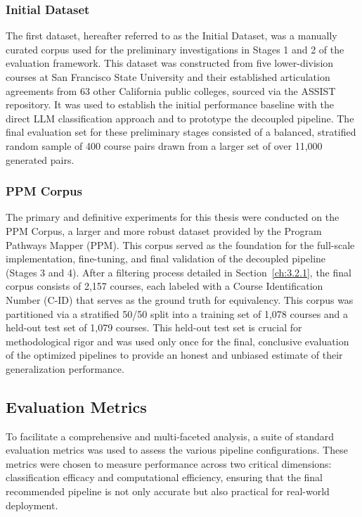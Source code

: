 \subsubsection{Initial Dataset}
The first dataset, hereafter referred to as the Initial Dataset, was a manually curated corpus used for the preliminary investigations in Stages 1 and 2 of the evaluation framework. This dataset was constructed from five lower-division courses at San Francisco State University and their established articulation agreements from 63 other California public colleges, sourced via the ASSIST repository. It was used to establish the initial performance baseline with the direct LLM classification approach and to prototype the decoupled pipeline. The final evaluation set for these preliminary stages consisted of a balanced, stratified random sample of 400 course pairs drawn from a larger set of over 11,000 generated pairs.

\subsubsection{PPM Corpus}
The primary and definitive experiments for this thesis were conducted on the PPM Corpus, a larger and more robust dataset provided by the Program Pathways Mapper (PPM). This corpus served as the foundation for the full-scale implementation, fine-tuning, and final validation of the decoupled pipeline (Stages 3 and 4). After a filtering process detailed in Section~\ref{ch:3.2.1}, the final corpus consists of 2,157 courses, each labeled with a Course Identification Number (C-ID) that serves as the ground truth for equivalency. This corpus was partitioned via a stratified 50/50 split into a training set of 1,078 courses and a held-out test set of 1,079 courses. This held-out test set is crucial for methodological rigor and was used only once for the final, conclusive evaluation of the optimized pipelines to provide an honest and unbiased estimate of their generalization performance.

\subsection{Evaluation Metrics}
To facilitate a comprehensive and multi-faceted analysis, a suite of standard evaluation metrics was used to assess the various pipeline configurations. These metrics were chosen to measure performance across two critical dimensions: classification efficacy and computational efficiency, ensuring that the final recommended pipeline is not only accurate but also practical for real-world deployment.

